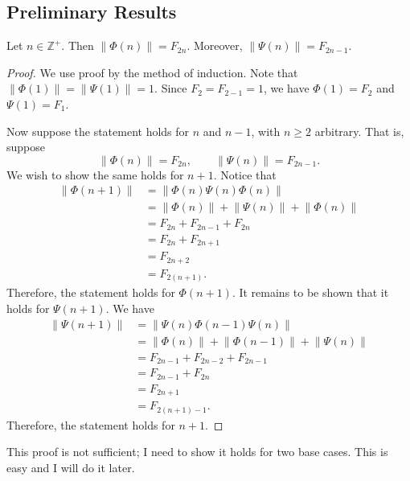 \documentclass[11pt, letterpaper]{article}
\begin{document}
\subsection{Preliminary Results}
\begin{lemma}\label{lma:1}
	Let $n\in\mathbb{Z}^+$. Then $\left\lVert \Phi (n) \right\rVert =F_{2n}$. Moreover, $\left\lVert \Psi (n) \right\rVert =F_{2n-1}$.
\end{lemma}
\begin{proof}
	We use proof by the method of induction. Note that $\left\lVert \Phi (1) \right\rVert =\left\lVert \Psi (1) \right\rVert =1$. Since $F_2=F_{2-1}=1$, we have $\Phi (1)=F_2$ and $\Psi (1)=F_1$.

	Now suppose the statement holds for $n$ and $n-1$, with $n\geq 2$ arbitrary. That is, suppose
	\[
		\left\lVert \Phi (n) \right\rVert =F_{2n},\qquad \left\lVert \Psi (n) \right\rVert =F_{2n-1}
	.\]
	We wish to show the same holds for $n+1$. Notice that
	\begin{align*}
		\left\lVert \Phi (n+1) \right\rVert &=\left\lVert \Phi (n)\Psi (n)\Phi (n) \right\rVert \\
						    &=\left\lVert \Phi (n) \right\rVert +\left\lVert \Psi (n) \right\rVert +\left\lVert \Phi (n) \right\rVert\\
						    &=F_{2n}+F_{2n-1}+F_{2n}\\
						    &=F_{2n}+F_{2n+1}\\
						    &=F_{2n+2}\\
						    &=F_{2(n+1)}
	.\end{align*}
	Therefore, the statement holds for $\Phi (n+1)$. It remains to be shown that it holds for $\Psi (n+1)$. We have
	\begin{align*}
		\left\lVert \Psi (n+1)\right\rVert &=\left\lVert \Psi (n)\Phi (n-1)\Psi (n) \right\rVert \\
						   &=\left\lVert \Phi (n) \right\rVert +\left\lVert \Phi (n-1) \right\rVert +\left\lVert \Psi (n) \right\rVert \\
						   &=F_{2n-1}+F_{2n-2}+F_{2n-1}\\
						   &=F_{2n-1}+F_{2n}\\
						   &=F_{2n+1}\\
						   &=F_{2(n+1)-1}
	.\end{align*}
	Therefore, the statement holds for $n+1$.
\end{proof}
\begin{note}
	This proof is not sufficient; I need to show it holds for two base cases. This is easy and I will do it later.
\end{note}
\end{document}
